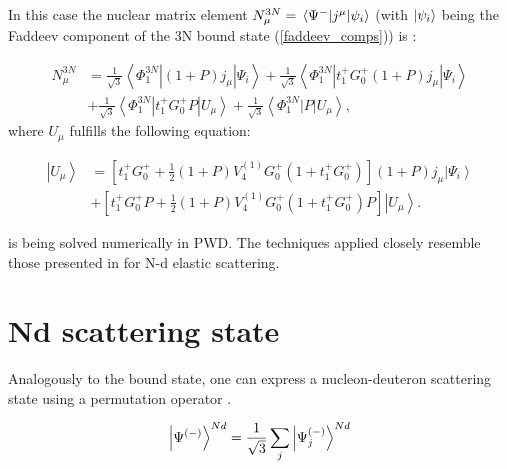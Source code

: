     In this case the nuclear matrix element 
    $N_\mu^{3 N} = \matrixel{\Psi^-}{j^\mu}{\psi_i}$ 
    (with $\ket{\psi_i}$ being the Faddeev component of the 3N bound state (\ref{faddeev_comps})) is
    \cite{GLOCKLE_report_1996, skibinski_prc_2003} :

    \begin{equation}
        \begin{aligned}
            N_\mu^{3 N} & =\frac{1}{\sqrt{3}}\left\langle\Phi_1^{3 N}\left|(1+P) j_\mu\right| \Psi_i\right\rangle+\frac{1}{\sqrt{3}}\left\langle\Phi_1^{3 N}\left|t_1^{+} G_0^{+}(1+P) j_\mu\right| \Psi_i\right\rangle \\
            & +\frac{1}{\sqrt{3}}\left\langle\Phi_1^{3 N}\left|t_1^{+} G_0^{+} P\right| U_\mu\right\rangle+\frac{1}{\sqrt{3}}\left\langle\Phi_1^{3 N}|P| U_\mu\right\rangle,
            \end{aligned}
        \label{3n_matrix}
    \end{equation}
    where $ U_\mu$ fulfills the
    following equation:

    \begin{equation}
        \begin{aligned}
            \left|U_\mu\right\rangle & =\left[t_1^{+} G_0^{+}+\frac{1}{2}(1+P) V_4^{(1)} G_0^{+}\left(1+t_1^{+} G_0^{+}\right)\right](1+P) j_\mu\left|\Psi_i\right\rangle \\
            & +\left[t_1^{+} G_0^{+} P+\frac{1}{2}(1+P) V_4^{(1)} G_0^{+}\left(1+t_1^{+} G_0^{+}\right) P\right]\left|U_\mu\right\rangle.
            \end{aligned}
        \label{u_mu}
    \end{equation}

     is being solved numerically in PWD. The techniques applied closely resemble those presented in \cite{GLOCKLE_report_1996} for N-d elastic scattering.



\section{Nd scattering state}
\label{nd_state}

    Analogously to the bound state, one can express a nucleon-deuteron
    scattering state
    using a permutation operator .

    \begin{equation}
        \ket{\Psi^{(-)}}^{Nd} = \frac{1}{\sqrt{3}}\sum_j\ket{\Psi^{(-)}_j}^{Nd}    
    \end{equation}

